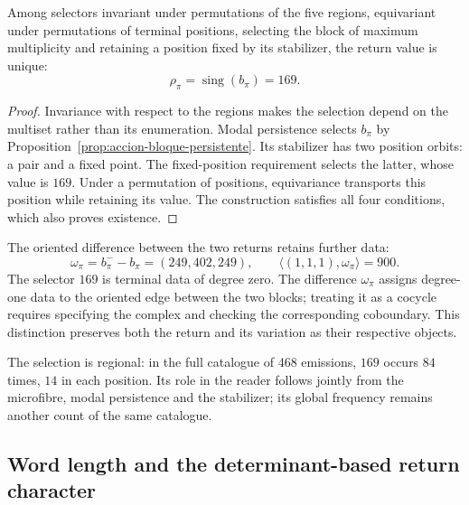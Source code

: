 \begin{theorem}
\label{thm:accion-selector-169}
Among selectors invariant under permutations of the five regions,
equivariant under permutations of terminal positions, selecting the
block of maximum multiplicity and retaining a position fixed by its
stabilizer, the return value is unique:
\[
 \rho_\pi=\operatorname{sing}(b_\pi)=169.
\]
\end{theorem}
\begin{proof}
Invariance with respect to the regions makes the selection depend on
the multiset rather than its enumeration. Modal persistence selects
\(b_\pi\) by Proposition~\ref{prop:accion-bloque-persistente}.
Its stabilizer has two position orbits: a pair and a fixed point.
The fixed-position requirement selects the latter, whose value is
\(169\). Under a permutation of positions, equivariance transports
this position while retaining its value. The construction satisfies
all four conditions, which also proves existence.
\end{proof}

The oriented difference between the two returns retains further data:
\[
 \omega_\pi=b_\pi^- - b_\pi=(249,402,249),\qquad
 \langle(1,1,1),\omega_\pi\rangle=900.
\]
The selector \(169\) is terminal data of degree zero. The difference
\(\omega_\pi\) assigns degree-one data to the oriented edge between
the two blocks; treating it as a cocycle requires specifying the complex
and checking the corresponding coboundary. This distinction preserves
both the return and its variation as their respective objects.

The selection is regional: in the full catalogue of \(468\) emissions,
\(169\) occurs \(84\) times, \(14\) in each position. Its role in
the reader follows jointly from the microfibre, modal persistence and
the stabilizer; its global frequency remains another count of the same
catalogue.

\subsection{Word length and the determinant-based return character}
\label{sec:accion-grado-determinante}

